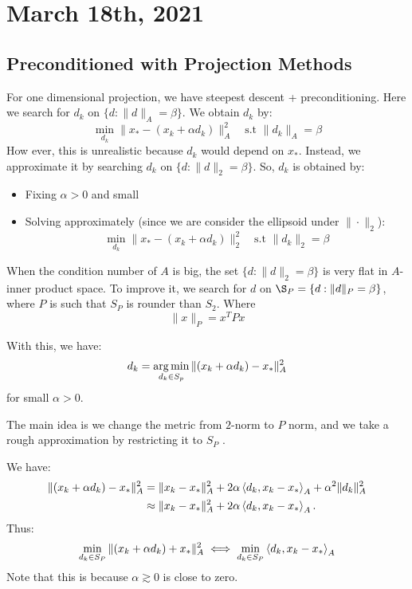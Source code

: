\documentclass[../main/main.tex]{subfiles}
\begin{document}
\section{March 18th, 2021}
\subsection{Preconditioned with Projection Methods}
For one dimensional projection, we have steepest descent + preconditioning. Here we search for $d_{k}$ on $\{ d : \|d\|_{A} = \beta \}$. We obtain $d_{k}$ by: \[
\min _{d_{k}} \|x_{*}-(x_{k}+\alpha d_{k})\|^2_{A} \quad \text{s.t } \|d_{k}\|_{A} = \beta
\] How ever, this is unrealistic because $d_{k}$ would depend on $x_{*}$. Instead, we approximate it by searching $d_{k}$ on $ \{d: \|d\|_{2} =\beta \}$. So, $d_k$ is obtained by:
\begin{itemize}
  \item Fixing $\alpha  > 0$ and small
  \item Solving approximately (since we are consider the ellipsoid under $\|\cdot \|_{2}$): \[
\min _{d_{k}} \|x_{*}-(x_{k}+\alpha d_{k})\|^2_{2} \quad \text{s.t } \|d_{k}\|_{2} = \beta
        \]
\end{itemize}
When the condition number of $A$ is big, the set $\{d : \|d\|_{2} = \beta \}$ is very flat in $A$-inner product space. To improve it, we search for $d$ on $\S_{P}=\{ d : \|d\|_{P} = \beta \}$, where $P$ is such that $S_{P}$ is rounder than $S_{2}$. Where \[
\|x\|_{P} = x^{T}Px
\]

With this, we have: \[
  d_{k} = \operatorname*{arg\,min}_{d_{k}\in S_{p}}\|(x_{k}+\alpha d_{k})-x_{*}\|_{A}^2
\]
for small $\alpha >0$.
\begin{remark}
  The main idea is we change the metric from $2$-norm to $P$ norm, and we take a rough approximation by restricting it to $S_{P}$ .
\end{remark}
We have:
\begin{align*}
  \|(x_{k}+\alpha d_{k})-x_{*}\|^2_{A} &= \|x_{k}-x_{*}\|_{A}^2 + 2\alpha  \left\langle{d_{k}},{x_{k}-x_{*}}\right\rangle_{A} +\alpha ^2 \|d_{k}\|_{A}^2\\
  &\approx \|x_{k}-x_{*}\|_{A}^2 + 2\alpha  \left\langle{d_{k}},{x_{k}-x_{*}}\right\rangle_{A}
  .\end{align*}
Thus: \[
\min _{d_{k}\in S_{P}} \|(x_{k}+\alpha d_{k})+x_{*}\|^2_{A} \iff \min_{d_{k}\in S_{P}}\left\langle{d_{k}},{x_{k}-x_{*}}\right\rangle_{A}
\]Note that this is because $\alpha\gtrsim 0 $ is close to zero.\\
\end{document}
